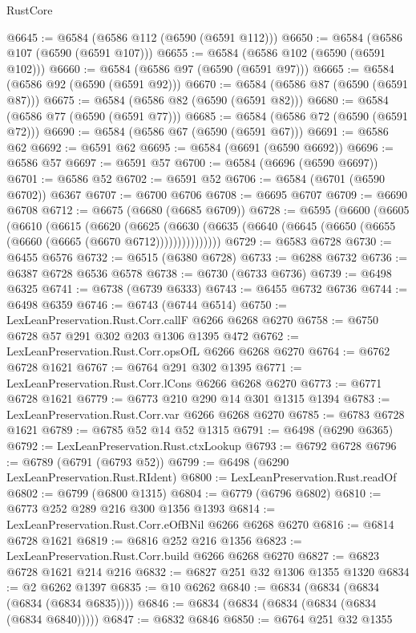 \begin{lexlean}{RustCore}
\begin{coremodule}
@6645 := @6584 (@6586 @112 (@6590 (@6591 @112)))
@6650 := @6584 (@6586 @107 (@6590 (@6591 @107)))
@6655 := @6584 (@6586 @102 (@6590 (@6591 @102)))
@6660 := @6584 (@6586 @97 (@6590 (@6591 @97)))
@6665 := @6584 (@6586 @92 (@6590 (@6591 @92)))
@6670 := @6584 (@6586 @87 (@6590 (@6591 @87)))
@6675 := @6584 (@6586 @82 (@6590 (@6591 @82)))
@6680 := @6584 (@6586 @77 (@6590 (@6591 @77)))
@6685 := @6584 (@6586 @72 (@6590 (@6591 @72)))
@6690 := @6584 (@6586 @67 (@6590 (@6591 @67)))
@6691 := @6586 @62
@6692 := @6591 @62
@6695 := @6584 (@6691 (@6590 @6692))
@6696 := @6586 @57
@6697 := @6591 @57
@6700 := @6584 (@6696 (@6590 @6697))
@6701 := @6586 @52
@6702 := @6591 @52
@6706 := @6584 (@6701 (@6590 @6702)) @6367
@6707 := @6700 @6706
@6708 := @6695 @6707
@6709 := @6690 @6708
@6712 := @6675 (@6680 (@6685 @6709))
@6728 := @6595
    (@6600
      (@6605
        (@6610
          (@6615
            (@6620
              (@6625
                (@6630 (@6635 (@6640 (@6645 (@6650 (@6655 (@6660 (@6665 (@6670 @6712)))))))))))))))
@6729 := @6583 @6728
@6730 := @6455 @6576
@6732 := @6515 (@6380 @6728)
@6733 := @6288 @6732
@6736 := @6387 @6728 @6536 @6578
@6738 := @6730 (@6733 @6736)
@6739 := @6498 @6325
@6741 := @6738 (@6739 @6333)
@6743 := @6455 @6732 @6736
@6744 := @6498 @6359
@6746 := @6743 (@6744 @6514)
@6750 := LexLeanPreservation.Rust.Corr.callF @6266 @6268 @6270
@6758 := @6750 @6728 @57 @291 @302 @203 @1306 @1395 @472
@6762 := LexLeanPreservation.Rust.Corr.opsOfL @6266 @6268 @6270
@6764 := @6762 @6728 @1621
@6767 := @6764 @291 @302 @1395
@6771 := LexLeanPreservation.Rust.Corr.lCons @6266 @6268 @6270
@6773 := @6771 @6728 @1621
@6779 := @6773 @210 @290 @14 @301 @1315 @1394
@6783 := LexLeanPreservation.Rust.Corr.var @6266 @6268 @6270
@6785 := @6783 @6728 @1621
@6789 := @6785 @52 @14 @52 @1315
@6791 := @6498 (@6290 @6365)
@6792 := LexLeanPreservation.Rust.ctxLookup
@6793 := @6792 @6728
@6796 := @6789 (@6791 (@6793 @52))
@6799 := @6498 (@6290 LexLeanPreservation.Rust.RIdent)
@6800 := LexLeanPreservation.Rust.readOf
@6802 := @6799 (@6800 @1315)
@6804 := @6779 (@6796 @6802)
@6810 := @6773 @252 @289 @216 @300 @1356 @1393
@6814 := LexLeanPreservation.Rust.Corr.eOfBNil @6266 @6268 @6270
@6816 := @6814 @6728 @1621
@6819 := @6816 @252 @216 @1356
@6823 := LexLeanPreservation.Rust.Corr.build @6266 @6268 @6270
@6827 := @6823 @6728 @1621 @214 @216
@6832 := @6827 @251 @32 @1306 @1355 @1320
@6834 := @2 @6262 @1397
@6835 := @10 @6262
@6840 := @6834 (@6834 (@6834 (@6834 (@6834 @6835))))
@6846 := @6834 (@6834 (@6834 (@6834 (@6834 (@6834 @6840)))))
@6847 := @6832 @6846
@6850 := @6764 @251 @32 @1355

\end{coremodule}
\end{lexlean}
